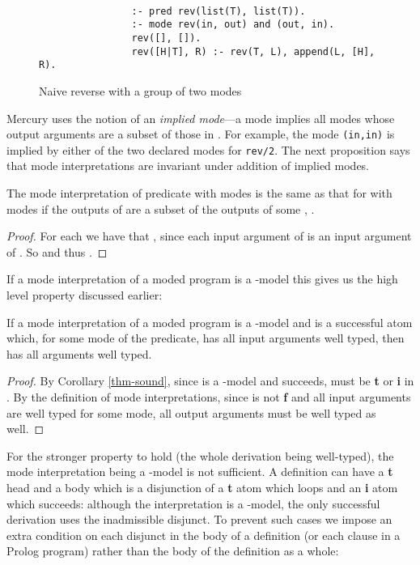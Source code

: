 \documentclass{tlp}
\begin{document}
\begin{figure}
\begin{verbatim}

                :- pred rev(list(T), list(T)).
                :- mode rev(in, out) and (out, in).
                rev([], []).
                rev([H|T], R) :- rev(T, L), append(L, [H], R).
\end{verbatim}
\caption{Naive reverse with a group of two modes\label{fig-nrev}}
\end{figure}

Mercury uses the notion of an \emph{implied mode}---a mode 
implies all modes whose output arguments are a subset of those in .
For example, the mode \texttt{(in,in)} is implied by either of the two
declared modes for \texttt{rev/2}.  
The next proposition says that mode 
interpretations are invariant under addition of implied modes.

\begin{proposition}
\label{prop-imp-mode}
The mode interpretation of predicate  with modes 
is the same as that for  with modes  if
the outputs of  are a subset of the outputs of some , .
\end{proposition}
\begin{proof}
For each  we have that , 
since each input argument of  is an input argument of .
So 
and thus
.
\end{proof}



\noindent
If a mode interpretation of a moded program  is a
-model
this gives us the high level property discussed earlier:
\begin{proposition} \rm
\label{lem-mode-head}
If a mode interpretation  of a moded program  is a
-model and  is a
successful atom which, for some mode of the predicate, has all input
arguments well typed, then  has all arguments well typed.
\end{proposition}
\begin{proof}
By Corollary \ref{thm-sound}, since  is a -model
and  succeeds,
 must be \textbf{t} or \textbf{i} in .  By the definition of mode
interpretations, since  is not \textbf{f} and all input arguments
are well typed for some mode, all output arguments must be well typed
as well.
\end{proof}
For the stronger property to hold (the whole derivation being well-typed),
the mode interpretation being a -model is not
sufficient.  A definition can have a \textbf{t} head and a body which is a
disjunction of a \textbf{t} atom which loops and an \textbf{i} atom which
succeeds: although the interpretation is a -model, the
only successful derivation uses the inadmissible disjunct.  To prevent
such cases we impose an extra condition on each disjunct in the body of
a definition (or each clause in a Prolog program) rather than the body
of the definition as a whole:
\end{document}
